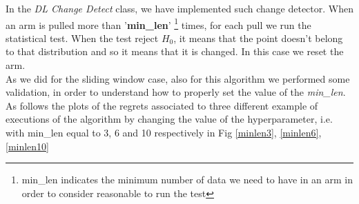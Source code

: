 In the \textit{DL Change Detect} class, we have implemented such change detector. When an arm is pulled more than '\textbf{min\_len}' \footnote{min\_len indicates the minimum number of data we need to have in an arm in order to consider reasonable to run the test} times, for each pull we run the statistical test. When the test reject $H_0$, it means that the point doesn't belong to that distribution and so it means that it is changed. In this case we reset the arm.\\ 
As we did for the sliding window case, also for this algorithm we performed some validation, in order to understand how to properly set the value of the \textit{min\_len}. As follows the plots of the regrets associated to three different example of executions of the algorithm by changing the value of the hyperparameter, i.e. with min\_len equal to 3, 6 and 10 respectively in Fig \ref{minlen3}, \ref{minlen6}, \ref{minlen10}

